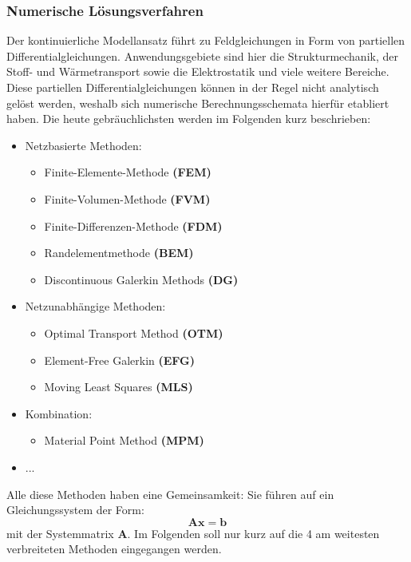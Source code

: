 \subsubsection{Numerische Lösungsverfahren}

Der kontinuierliche Modellansatz führt zu Feldgleichungen in Form von partiellen Differentialgleichungen. Anwendungsgebiete sind hier die Strukturmechanik, der Stoff- und Wärmetransport sowie die Elektrostatik und viele weitere Bereiche. Diese partiellen Differentialgleichungen können in der Regel nicht analytisch gelöst werden, weshalb sich numerische Berechnungsschemata hierfür etabliert haben. Die heute gebräuchlichsten werden im Folgenden kurz beschrieben:

\begin{itemize}
\item Netzbasierte Methoden:\begin{itemize}
\item Finite-Elemente-Methode \textbf{(FEM)}
\item Finite-Volumen-Methode \textbf{(FVM)}
\item Finite-Differenzen-Methode \textbf{(FDM)}
\item Randelementmethode \textbf{(BEM)}
\item Discontinuous Galerkin Methods \textbf{(DG)}
\end{itemize}


\item Netzunabhängige Methoden:\begin{itemize}
\item Optimal Transport Method \textbf{(OTM)}
\item Element-Free Galerkin \textbf{(EFG)}
\item Moving Least Squares \textbf{(MLS)}
\end{itemize}


\item Kombination:\begin{itemize}
\item Material Point Method \textbf{(MPM)}
\end{itemize}


\item ...
\end{itemize}

Alle diese Methoden haben eine Gemeinsamkeit: Sie führen auf ein Gleichungssystem der Form:
\begin{equation}
\label{LGS}
\boldsymbol{Ax}=\boldsymbol{b}
\end{equation}
mit der Systemmatrix $\boldsymbol{A}$. Im Folgenden soll nur kurz auf die 4 am weitesten verbreiteten Methoden eingegangen werden.

